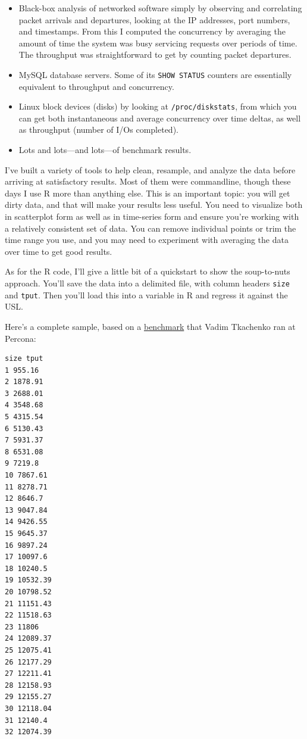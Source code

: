 \documentclass{vivid_layout}
\begin{document}
\begin{itemize}
\item Black-box analysis of networked software simply by observing and
correlating packet arrivals and departures, looking at the IP addresses, port
numbers, and timestamps. From this I computed the concurrency by averaging the
amount of time the system was busy servicing requests over periods of time. The
throughput was straightforward to get by counting packet departures.
\item MySQL database servers. Some of its \texttt{SHOW STATUS} counters are
essentially equivalent to throughput and concurrency.
\item Linux block devices (disks) by looking at \texttt{/proc/diskstats}, from
which you can get both instantaneous and average concurrency over time deltas,
as well as throughput (number of I/Os completed).
\item Lots and lots---and lots---of benchmark results.
\end{itemize}

I've built a variety of tools to help clean, resample, and analyze the data
before arriving at satisfactory results. Most of them were commandline, though
these days I use R more than anything else. This is an important topic:
you will get dirty data, and that will
make your results less useful. You need to visualize both in scatterplot form as
well as in time-series form and ensure you're working with a relatively
consistent set of data. You can remove individual points or trim the time range
you use, and you may need to experiment with averaging the data over time to get
good results.

As for the R code, I'll give a little bit of a quickstart to show the
soup-to-nuts approach.  You'll save the data into a delimited file, with column
headers \texttt{size} and \texttt{tput}. Then you'll load this into a variable
in R and regress it against the USL.

Here's a complete sample, based on a
\href{https://www.percona.com/docs/wiki/benchmark:cisco:scale:start}{benchmark}
that Vadim Tkachenko ran at Percona:

\begin{verbatim}
size tput
1 955.16
2 1878.91
3 2688.01
4 3548.68
5 4315.54
6 5130.43
7 5931.37
8 6531.08
9 7219.8
10 7867.61
11 8278.71
12 8646.7
13 9047.84
14 9426.55
15 9645.37
16 9897.24
17 10097.6
18 10240.5
19 10532.39
20 10798.52
21 11151.43
22 11518.63
23 11806
24 12089.37
25 12075.41
26 12177.29
27 12211.41
28 12158.93
29 12155.27
30 12118.04
31 12140.4
32 12074.39
\end{verbatim}
\end{document}
